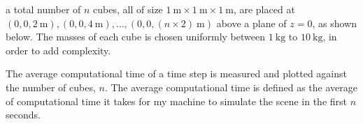 a total number of $n$ cubes, all of size $\SI{1}{\m} \times \SI{1}{\m} \times \SI{1}{\m}$, 
are placed at $(0, 0, \SI{2}{\m}), (0, 0, \SI{4}{\m}), \ldots, (0, 0, (n \times 2)\SI{}{\m})$ above a plane of $z = 0$, 
as shown below.
The masses of each cube is chosen uniformly between $\SI{1}{\kg}$ to $\SI{10}{\kg}$, in order to add complexity.

\begin{center}
\end{center}

The average computational time of a time step is measured and plotted against the number of cubes, $n$.
The average computational time is defined as the average of computational time 
it takes for my machine to simulate the scene in the first $n$ seconds.